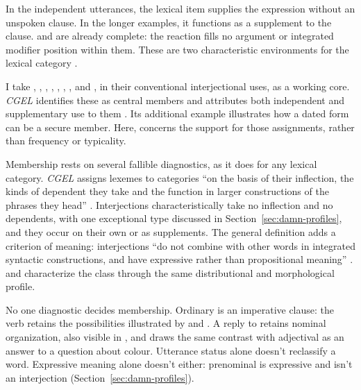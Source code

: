\documentclass[12pt]{article}
\begin{document}
In the independent utterances, the lexical item supplies the expression
without an unspoken clause. In the longer examples, it functions as
a supplement to the clause.  and  are already complete: the reaction fills no argument or integrated
modifier position within them. These are two characteristic environments
for the lexical category .

I take , , , ,
, , , and , in their
conventional interjectional uses, as a working core. \textit{CGEL}
identifies these as central members and attributes both independent and
supplementary use to them \citep[1361]{HuddlestonPullum2002}. Its
additional example  illustrates how a dated form can be a
secure member. Here,  concerns the support for those
assignments, rather than frequency or typicality.

Membership rests on several fallible diagnostics, as it does for any
lexical category. \textit{CGEL} assigns lexemes to categories \enquote{on
the basis of their inflection, the kinds of dependent they take and the
function in larger constructions of the phrases they head}
\citep[30]{HuddlestonPullum2002}. Interjections characteristically take no
inflection \citep[106]{ameka1992} and no dependents, with one exceptional
type discussed in Section~\ref{sec:damn-profiles}, and they occur on their
own or as supplements. The general definition adds a criterion of meaning:
interjections \enquote{do not combine with other words in integrated
syntactic constructions, and have expressive rather than propositional
meaning} \citep[1361]{HuddlestonPullum2002}. \textcite[105--106]{ameka1992}
and \textcite[124--125]{wilkins1992} characterize the class through the
same distributional and morphological profile.

No one diagnostic decides membership. Ordinary  is an
imperative clause: the verb retains the possibilities illustrated by
 and . A reply 
to  retains nominal organization, also
visible in , and \textcite[124--125]{wilkins1992}
draws the same contrast with adjectival  as an answer to a
question about colour. Utterance status alone doesn't reclassify a word.
Expressive meaning alone doesn't either: prenominal  is
expressive and isn't an interjection (Section~\ref{sec:damn-profiles}).
\end{document}
